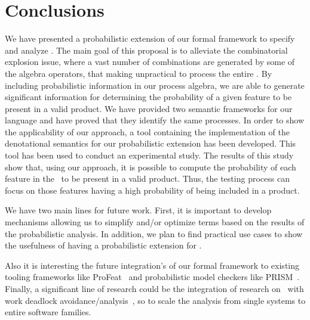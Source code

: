 \section{Conclusions}
\label{section:jstat:concs}

We have presented a probabilistic extension of our
formal framework to specify and analyze \SPLs. The main goal of this
proposal is to alleviate the combinatorial explosion issue, where a vast
number of combinations are generated by some of the algebra operators,
that making unpractical to process the entire \SPL. By including probabilistic information in our process algebra, we are able to generate significant information for determining the probability
of a given feature to be present in a valid product. We have provided two semantic frameworks for our language and have proved that they identify the same processes.
%
In order to show the applicability of our approach, a tool containing the
implementation of the denotational semantics for our probabilistic extension
has been developed. This tool has been used to conduct an experimental study.
%
The results of this study show that, using our approach, it is possible to compute
the probability of each feature in the \SPL\ to be present in a valid product.
Thus, the testing process can focus on those features having a high probability
of being included in a product.



%
%
%
%
We have two main lines for future work. First, it is important to develop
mechanisms allowing us to simplify and/or optimize terms
based on the results of the probabilistic analysis. In addition,
we plan to find practical use cases to show the usefulness of having a probabilistic extension for \SPLs.

Also it is interesting the future integration's of our formal framework to existing tooling frameworks
like ProFeat~\cite{Chrszon2018} and probabilistic model checkers like PRISM~\cite{mgd12}.
Finally, a significant line of research could be the integration of research on \SPL\ with work 
deadlock avoidance/analysis~\cite{BravettiCZ18, BoerBLZ18, BravettiCZ17, AnconaEtAl16, BravettiZ09}, so to 
scale the analysis from single systems to entire software families.

